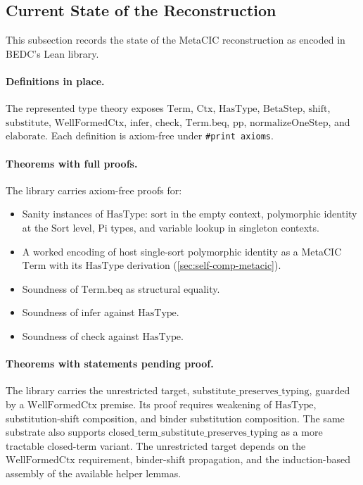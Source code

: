 \subsection{Current State of the Reconstruction}\label{subsec:current-state}

This subsection records the state of the MetaCIC reconstruction as encoded
in BEDC's Lean library.

\paragraph{Definitions in place.} The represented type theory exposes
$\mathrm{Term}$, $\mathrm{Ctx}$, $\mathrm{HasType}$,
$\mathrm{BetaStep}$, $\mathrm{shift}$, $\mathrm{substitute}$,
$\mathrm{WellFormedCtx}$, $\mathrm{infer}$, $\mathrm{check}$,
$\mathrm{Term.beq}$, $\mathrm{pp}$, $\mathrm{normalizeOneStep}$, and
$\mathrm{elaborate}$. Each definition is axiom-free under
\texttt{\#print axioms}.

\paragraph{Theorems with full proofs.} The library carries axiom-free proofs
for:
\begin{itemize}
  \item Sanity instances of $\mathrm{HasType}$: $\mathrm{sort}$ in the empty
    context, polymorphic identity at the $\mathrm{Sort}$ level,
    $\mathrm{Pi}$ types, and variable lookup in singleton contexts.
  \item A worked encoding of host single-sort polymorphic identity as a
    MetaCIC $\mathrm{Term}$ with its $\mathrm{HasType}$ derivation
    (\autoref{sec:self-comp-metacic}).
  \item Soundness of $\mathrm{Term.beq}$ as structural equality.
  \item Soundness of $\mathrm{infer}$ against $\mathrm{HasType}$.
  \item Soundness of $\mathrm{check}$ against $\mathrm{HasType}$.
\end{itemize}

\paragraph{Theorems with statements pending proof.} The library carries the
unrestricted target, $\mathrm{substitute\_preserves\_typing}$, guarded by a
$\mathrm{WellFormedCtx}$ premise. Its proof requires weakening of
$\mathrm{HasType}$, substitution-shift composition, and binder substitution
composition. The same substrate also supports
$\mathrm{closed\_term\_substitute\_preserves\_typing}$ as a more tractable
closed-term variant. The unrestricted target depends on the
$\mathrm{WellFormedCtx}$ requirement, binder-shift propagation, and the
induction-based assembly of the available helper lemmas.

